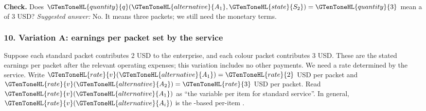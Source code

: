 \textbf{Check.} Does $\GTenToneHL{quantity}{q}(\GTenToneHL{alternative}{A_1},\GTenToneHL{state}{S_2})=\GTenToneHL{quantity}{3}$ mean a  of 3 USD? \emph{Suggested answer:} No. It means three packets; we still need the monetary terms.

\subsubsection*{10. Variation A: earnings per packet set by the service}
Suppose each standard packet contributes 2 USD to the enterprise, and each colour packet contributes 3 USD. These are the stated earnings per packet after the relevant operating expenses; this variation includes no other payments. We need a rate determined by the service. Write $\GTenToneHL{rate}{v}(\GTenToneHL{alternative}{A_1})=\GTenToneHL{rate}{2}$ USD per packet and $\GTenToneHL{rate}{v}(\GTenToneHL{alternative}{A_2})=\GTenToneHL{rate}{3}$ USD per packet. Read $\GTenToneHL{rate}{v}(\GTenToneHL{alternative}{A_1})$ as ``the variable  per item for standard service''. In general, $\GTenToneHL{rate}{v}(\GTenToneHL{alternative}{A_i})$ is the -based per-item .

